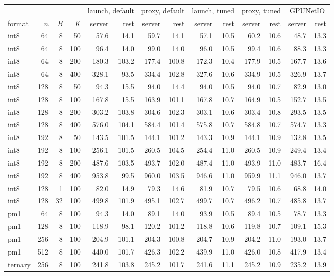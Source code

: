 \begin{tabular}{lrrrrrrrrrrrrr}\toprule
 & & & & \multicolumn{2}{c}{launch, default} & \multicolumn{2}{c}{proxy, default} & \multicolumn{2}{c}{launch, tuned} & \multicolumn{2}{c}{proxy, tuned} & \multicolumn{2}{c}{GPUNetIO} \\
\cmidrule(lr){5-6}\cmidrule(lr){7-8}\cmidrule(lr){9-10}\cmidrule(lr){11-12}\cmidrule(lr){13-14}
format & $n$ & $B$ & $K$ & server & rest & server & rest & server & rest & server & rest & server & rest \\ \midrule
int8 & 64 & 8 & 50 & 57.6 & 14.1 & 59.7 & 14.1 & 57.1 & 10.5 & 60.2 & 10.6 & 48.7 & 13.3 \\
int8 & 64 & 8 & 100 & 96.4 & 14.0 & 99.0 & 14.0 & 96.0 & 10.5 & 99.4 & 10.6 & 88.3 & 13.3 \\
int8 & 64 & 8 & 200 & 180.3 & 103.2 & 177.4 & 100.8 & 172.3 & 10.4 & 177.9 & 10.5 & 167.7 & 13.6 \\
int8 & 64 & 8 & 400 & 328.1 & 93.5 & 334.4 & 102.8 & 327.6 & 10.6 & 334.9 & 10.5 & 326.9 & 13.7 \\
int8 & 128 & 8 & 50 & 94.3 & 15.5 & 94.0 & 14.4 & 94.0 & 10.5 & 94.0 & 10.7 & 82.9 & 13.0 \\
int8 & 128 & 8 & 100 & 167.8 & 15.5 & 163.9 & 101.1 & 167.8 & 10.7 & 164.9 & 10.5 & 152.7 & 13.5 \\
int8 & 128 & 8 & 200 & 303.2 & 103.8 & 304.6 & 102.3 & 303.1 & 10.6 & 303.4 & 10.8 & 293.5 & 13.5 \\
int8 & 128 & 8 & 400 & 576.0 & 104.1 & 584.4 & 101.4 & 575.8 & 10.7 & 584.8 & 10.7 & 574.7 & 13.3 \\
int8 & 192 & 8 & 50 & 143.5 & 101.5 & 144.1 & 101.2 & 143.3 & 10.9 & 144.1 & 10.9 & 132.8 & 13.5 \\
int8 & 192 & 8 & 100 & 256.1 & 101.5 & 260.5 & 104.5 & 254.4 & 11.0 & 260.5 & 10.9 & 249.4 & 13.4 \\
int8 & 192 & 8 & 200 & 487.6 & 103.5 & 493.7 & 102.0 & 487.4 & 11.0 & 493.9 & 11.0 & 483.7 & 16.4 \\
int8 & 192 & 8 & 400 & 953.8 & 99.5 & 960.0 & 103.5 & 946.6 & 11.0 & 959.9 & 11.1 & 946.0 & 13.7 \\
int8 & 128 & 1 & 100 & 82.0 & 14.9 & 79.3 & 14.6 & 81.9 & 10.7 & 79.5 & 10.6 & 68.8 & 14.0 \\
int8 & 128 & 32 & 100 & 499.8 & 101.9 & 495.1 & 102.7 & 499.7 & 10.7 & 496.2 & 10.7 & 485.8 & 13.7 \\
pm1 & 64 & 8 & 100 & 94.3 & 14.0 & 89.1 & 14.0 & 93.9 & 10.5 & 89.4 & 10.5 & 78.7 & 13.3 \\
pm1 & 128 & 8 & 100 & 118.9 & 98.1 & 120.2 & 101.2 & 118.8 & 10.6 & 119.8 & 10.7 & 109.1 & 15.3 \\
pm1 & 256 & 8 & 100 & 204.9 & 101.1 & 204.3 & 100.8 & 204.7 & 10.9 & 204.2 & 11.0 & 193.0 & 13.7 \\
pm1 & 512 & 8 & 100 & 440.0 & 101.7 & 426.3 & 102.2 & 439.9 & 11.0 & 426.0 & 10.8 & 417.9 & 13.4 \\
ternary & 256 & 8 & 100 & 241.8 & 103.8 & 245.2 & 101.7 & 241.6 & 11.1 & 245.2 & 10.9 & 235.2 & 13.9 \\
\bottomrule\end{tabular}
